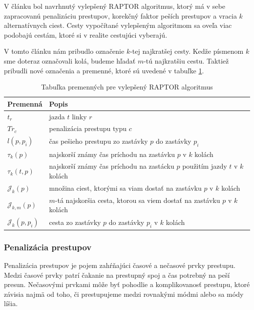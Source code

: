V článku \cite{improvedRaptor} bol navrhnutý vylepšený RAPTOR algoritmus, ktorý má v sebe zapracovanú penalizáciu prestupov, korekčný faktor peších prestupov a vracia $k$ alternatívnych ciest. Cesty vypočítané vylepšeným algoritmom sa oveľa viac podobajú cestám, ktoré si v realite cestujúci vyberajú.

V tomto článku nám pribudlo označenie $k$-tej najkratšej cesty. Kedže písmenom $k$ sme doteraz označovali kolá, budeme hľadať $m$-tú najkratšiu cestu. Taktiež pribudli nové označenia a premenné, ktoré sú uvedené v tabuľke \ref{table:raptor-variables}.

\begin{table}[H]
\begin{tabular}{|l|l|}
\hline
\rowcolor[HTML]{C0C0C0} 
\textbf{Premenná} & \textbf{Popis} \\ \hline
$t_r$             & jazda $t$ linky $r$          \\ \hline
$Tr_c$             & penalizácia prestupu typu $c$          \\ \hline
$l(p, p_i)$       & čas pešieho prestupu zo zastávky $p$ do zastávky $p_i$ \\ \hline
$\tau_k(p)$			& najskorší známy čas príchodu na zastávku $p$ v $k$ kolách \\ \hline
$\tau_k(t, p)$    & najskorší známy čas príchodu na zastácku $p$ použitím jazdy $t$ v $k$ kolách \\ \hline
$\mathcal{J}_k(p)$ & množina ciest, ktorými sa viam dostať na zastávku $p$ v $k$ kolách \\ \hline
$\mathcal{J}_{k,m}(p)$ & $m$-tá najskoršia cesta, ktorou sa viem dostať na zastávku $p$ v $k$ kolách \\ \hline
$\mathcal{J}_k(p, p_i)$ & cesta zo zastávky $p$ do zastávky $p_i$ v $k$ kolách \\ \hline
\end{tabular}
\caption{Tabuľka premenných pre vylepšený RAPTOR algoritmus}
\label{table:raptor-variables}
\end{table}

\subsubsection{Penalizácia prestupov}
Penalizácia prestupov je pojem zahŕňajúci časové a nečasové prvky prestupu. Medzi časové prvky patrí čakanie na prestupný spoj a čas potrebný na peší presun. Nečasovými prvkami môže byť pohodlie a komplikovanosť prestupu, ktoré závisia najmä od toho, či prestupujeme medzi rovnakými módmi alebo sa módy líšia. 

